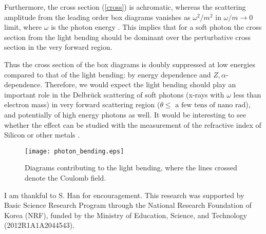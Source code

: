 \documentclass[aps,tightenlines,preprint]{revtex4-1}
\begin{document}
  
  Furthermore, the cross section (\ref{cross}) is achromatic, 
  whereas the scattering 
  amplitude from the leading order box diagrams vanishes 
  as $\omega^{2}/m^{2}$ in $\omega/m\to0$ limit, 
  where 
 $\omega$ is the photon energy \cite{mork}. This implies that 
 for a soft photon
 the  cross section  from  the light bending should be dominant over
  the perturbative cross section in the very forward region.
  
  Thus the  cross section of the box diagrams is doubly
  suppressed at low energies 
  compared to that of the light bending:
  by energy dependence and $Z,\alpha$-dependence. Therefore,
  we would expect the  light bending should play an important role
  in the Delbr{\"u}ck scattering of soft photons (x-rays with 
  $\omega$ less than
  electron mass) in very forward scattering 
  region ($\theta\leq \text{ a few tens of nano rad}$), and potentially of 
  high energy photons as well. It would be interesting to see
  whether the effect can be studied  with the measurement of 
  the refractive index of Silicon or other metals \cite{habs,naito}. 
   
 
 
  \begin{figure}[tb] \begin{center} 
\texttt{[image: photon\_bending.eps]} 
\end{center} 
\caption{Diagrams contributing to the light bending, 
where the lines crossed denote the Coulomb field.}
 \label{fig1} 
\end{figure}  



 
 



\begin{acknowledgments}
I am thankful to S. Han for encouragement. 
This research was supported by Basic Science 
Research Program through the National 
Research Foundation of Korea
(NRF), funded by the Ministry of 
Education, Science, and Technology
(2012R1A1A2044543).
\end{acknowledgments}




                             

%


\end{document}
